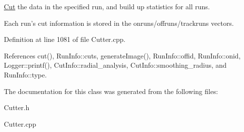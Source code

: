 \hyperlink{structCut}{Cut} the data in the specified run, and build up statistics for all runs. 

Each run's cut information is stored in the onruns/offruns/trackruns vectors. 

Definition at line 1081 of file Cutter.cpp.



References cut(), RunInfo::cuts, generateImage(), RunInfo::offid, RunInfo::onid, Logger::printf(), CutInfo::radial\_\-analysis, CutInfo::smoothing\_\-radius, and RunInfo::type.



The documentation for this class was generated from the following files:\begin{DoxyCompactItemize}
\item 
Cutter.h\item 
Cutter.cpp\end{DoxyCompactItemize}

